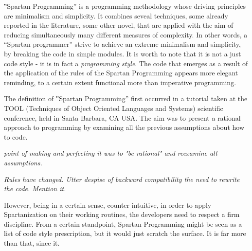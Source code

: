 
‟Spartan Programming” is a programming methodology whose driving principles are 
minimalism and simplicity. It combines seveal techniques, 
some already reported in the literature, some other novel, that are applied 
with the aim of reducing 
simultaneously many different measures of complexity.  
In other words, a ``Spartan programmer'' strive
to achieve an extreme minimalism and simplicity, by breaking 
the code in simple modules.  
It is worth to note that it is not a just code style - it is in fact a \emph{programming style}. 
The code that emerges as a result of the application of the rules of the 
Spartan Programming appears more elegant reminding, to a certain extent
functional more than imperative programming. 


The definition of ‟Spartan Programming” first occurred in a tutorial taken at
the TOOL (Techniques of Object Oriented Languages and Systems) scientific conference,
held in Santa Barbara, CA USA. %
The aim was to present a rational approach to programming by examining all the previous
assumptions about how to code.

\emph{point of making and perfecting it was to "be rational" and
reexamine all assumptions.}

\emph{Rules have changed.
Utter despise of backward compatibility the need to rewrite the code.
Mention it.}


However, being in a certain sense, counter intuitive, in order to apply
Spartanization on their working routines, the developers need to respect a
firm discipline. From a certain standpoint, Spartan Programming might be
seen as a list of code style prescription, but it would just scratch the
surface. It is far more than that, since it.

